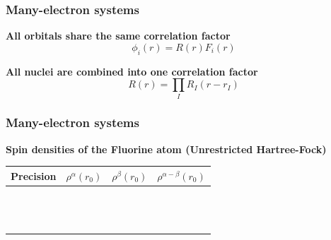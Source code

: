 \begin{frame}
\frametitle{Many-electron systems}
\scriptsize
\centering
\textbf{All orbitals share the same correlation factor}
\begin{equation}
    \nonumber
    \phi_i(r) = R(r) F_i(r)
\end{equation}

\vspace{10mm}

\textbf{All nuclei are combined into one correlation factor}
\begin{equation}
    \nonumber
    R(r) = \prod_I R_I(r - r_I)
\end{equation}

\end{frame}

\begin{frame}
\frametitle{Many-electron systems}
\centering
\scriptsize
\begin{table}
\textbf{Spin densities of the Fluorine atom (Unrestricted Hartree-Fock)}
\begin{tabular}{crrr}
\hline
\hline
\multicolumn{1}{c}{\textbf{Precision}}&
\multicolumn{1}{c}{$\rho^\alpha(r_0)$}&
\multicolumn{1}{c}{$\rho^\beta(r_0)$}&
\multicolumn{1}{c}{$\rho^{\alpha-\beta}(r_0)$}\\
\hline                        
\hspace{10mm}\     & \hspace{20mm}\     & \hspace{20mm}\     & \hspace{15mm}\ \\
                   &                    &                    &                \\
                   &                    &                    &                \\
                   &                    &                    &                \\
                   &                    &                    &                \\
                   &                    &                    &                \\
                   &                    &                    &                \\
                   &                    &                    &                \\
                   &                    &                    &                \\

\end{tabular}
\end{table}
\end{frame}
